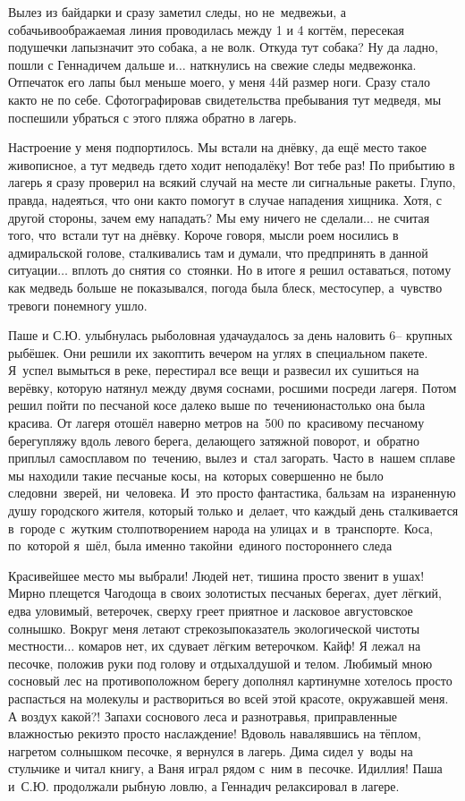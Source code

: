 \newpage
Вылез из байдарки и сразу заметил следы, но не~медвежьи, а собачьи\mdash воображаемая линия проводилась между 1 и 4 когтём, пересекая подушечки лапы\mdash значит это собака, а не волк. Откуда тут собака? Ну да ладно, пошли с Геннадичем дальше и$\ldots$ наткнулись на свежие следы медвежонка. Отпечаток его лапы был меньше моего, у меня 44\sdash й размер ноги. Сразу стало как\sdash то не по себе. Сфотографировав свидетельства пребывания тут медведя, мы поспешили убраться с этого пляжа обратно в лагерь. 

Настроение у меня подпортилось. Мы встали на днёвку, да ещё место такое живописное, а тут медведь где\sdash то ходит неподалёку! Вот тебе раз! По прибытию в лагерь я сразу проверил на всякий случай на месте ли сигнальные ракеты. Глупо, правда, надеяться, что они как\sdash то помогут в случае нападения хищника. Хотя, с другой стороны, зачем ему нападать? Мы ему ничего не сделали$\ldots$ не считая того, что~встали тут на днёвку. Короче говоря, мысли роем носились в адмиральской голове, сталкивались там и думали, что предпринять в данной ситуации$\ldots$ вплоть до снятия со~стоянки. Но в итоге я решил оставаться, потому как медведь больше не показывался, погода была блеск, место\mdash супер, а~чувство тревоги понемногу ушло. 

Паше и С.Ю. улыбнулась рыболовная удача\mdash удалось за день наловить 6\thinspace\nobreakdash-- крупных рыбёшек. Они решили их закоптить вечером на углях в специальном пакете. Я~успел вымыться в реке, перестирал все вещи и развесил их сушиться на верёвку, которую натянул между двумя соснами, росшими посреди лагеря. Потом решил пойти по песчаной косе далеко выше по~течению\mdash настолько она была красива. От лагеря отошёл наверно метров на~500 по~красивому песчаному берегу\sdash пляжу вдоль левого берега, делающего затяжной поворот, и~обратно приплыл самосплавом по~течению, вылез и~стал загорать. Часто в~нашем сплаве мы находили такие песчаные косы, на~которых совершенно не было следов\mdash ни~зверей, ни~человека. И~это просто фантастика, бальзам на~израненную душу городского жителя, который только и~делает, что каждый день сталкивается в~городе с~жутким столпотворением народа на улицах и~в~транспорте. Коса, по~которой я~шёл, была именно такой\mdash ни~единого постороннего следа\mdash

Красивейшее место мы выбрали! Людей нет, тишина просто звенит в ушах! Мирно плещется Чагодоща в своих золотистых песчаных берегах, дует лёгкий, едва уловимый, ветерочек, сверху греет приятное и ласковое августовское солнышко. Вокруг меня летают стрекозы\mdash показатель экологической чистоты местности$\ldots$ комаров нет, их сдувает лёгким ветерочком. Кайф! Я лежал на песочке, положив руки под голову и отдыхал\mdash душой и телом. Любимый мною сосновый лес на противоположном берегу дополнял картину\mdash мне хотелось просто распасться на молекулы и раствориться во всей этой красоте, окружавшей меня. А воздух какой?! Запахи соснового леса и разнотравья, приправленные влажностью реки\mdash это просто наслаждение! Вдоволь навалявшись на тёплом, нагретом солнышком песочке, я вернулся в лагерь. Дима сидел у~воды на стульчике и читал книгу, а Ваня играл рядом с~ним в~песочке. Идиллия! Паша и~С.Ю. продолжали рыбную ловлю, а Геннадич релаксировал в лагере.


